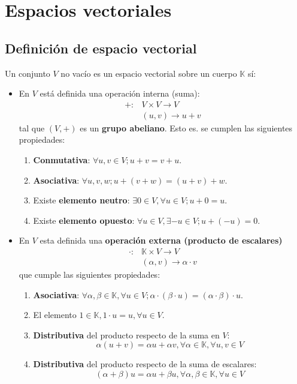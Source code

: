 \chapter{Espacios vectoriales}

\section{Definición de espacio vectorial}

Un conjunto $V$ no vacío es un espacio vectorial sobre un cuerpo $\mathbb{K}$ sí:
\begin{itemize}
\item En $V$ está definida una operación interna (suma):
\begin{align*}
+ : &V \times V \rightarrow V \\
&(u,v) \rightarrow u +v
\end{align*}
tal que $(V,+)$ es un \textbf{grupo abeliano}. Esto es. se cumplen las siguientes propiedades:
\begin{enumerate}
\item \textbf{Conmutativa}: $\forall u,v \in V; u+v=v+u$.
\item \textbf{Asociativa}: $\forall u,v,w; u+(v+w)=(u+v)+w$.
\item Existe \textbf{elemento neutro}: $\exists 0 \in V, \forall u \in V;u+0=u$.
\item Existe \textbf{elemento opuesto}: $\forall u \in V, \exists -u \in V; u+(-u)=0$.
\end{enumerate}

\item En $V$ esta definida una \textbf{operación externa (producto de escalares)}
\begin{align*}
\cdot : &\mathbb{K} \times V \rightarrow V \\
&(\alpha,v) \rightarrow \alpha\cdot v
\end{align*}
que cumple las siguientes propiedades:
\begin{enumerate}
	\item \textbf{Asociativa}: $\forall \alpha,\beta \in \mathbb{K},\forall u \in V; \alpha \cdot (\beta \cdot u)=(\alpha \cdot \beta) \cdot u$.
	\item El elemento $1 \in \mathbb{K}, 1 \cdot u = u, \forall u \in V$.
	\item \textbf{Distributiva} del producto respecto de la suma en $V$:
	\[
	\alpha (u + v) = \alpha u + \alpha v, \forall \alpha \in \mathbb{K}, \forall u,v \in V
	\]
	\item \textbf{Distributiva} del producto respecto de la suma de escalares:
	\[
	(\alpha + \beta)u = \alpha u + \beta u, \forall \alpha,\beta \in \mathbb{K}, \forall u \in V
	\]
\end{enumerate}
\end{itemize}

